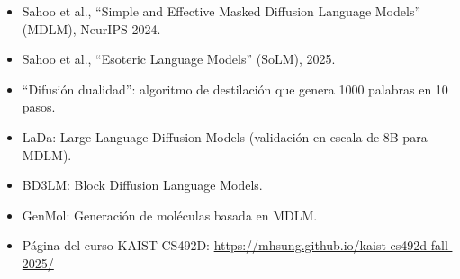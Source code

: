 \documentclass[a4paper]{article}
\begin{document}
\begin{itemize}
    \item Sahoo et al., ``Simple and Effective Masked Diffusion Language Models'' (MDLM), NeurIPS 2024.
    \item Sahoo et al., ``Esoteric Language Models'' (SoLM), 2025.
    \item ``Difusión dualidad'': algoritmo de destilación que genera 1000 palabras en 10 pasos.
    \item LaDa: Large Language Diffusion Models (validación en escala de 8B para MDLM).
    \item BD3LM: Block Diffusion Language Models.
    \item GenMol: Generación de moléculas basada en MDLM.
    \item Página del curso KAIST CS492D: \url{https://mhsung.github.io/kaist-cs492d-fall-2025/}
\end{itemize}

\end{document}
